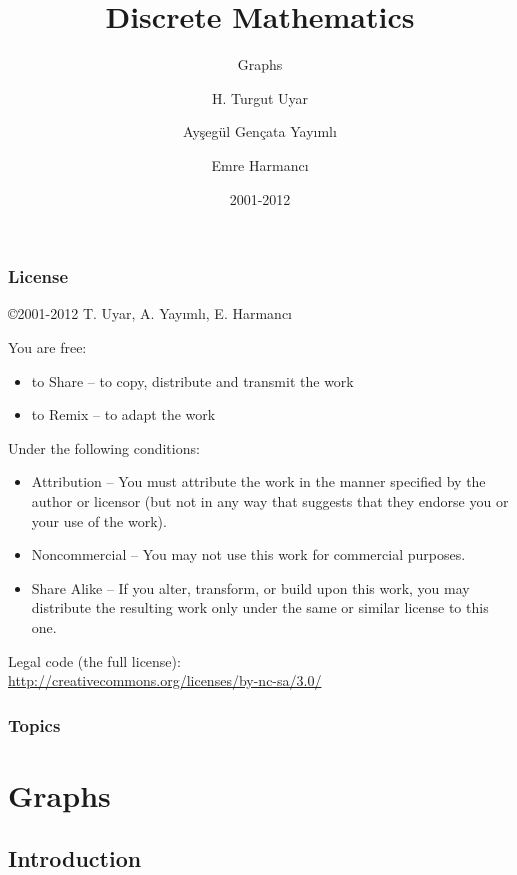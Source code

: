 \documentclass[dvipsnames]{beamer}
\title{Discrete Mathematics}
\subtitle{Graphs}
\author{H. Turgut Uyar \and Ayşegül Gençata Yayımlı \and Emre Harmancı}
\date{2001-2012}
\begin{document}
\begin{frame}
  \titlepage
\end{frame}

\begin{frame}
  \frametitle{License}

  \hfill
  \copyright 2001-2012 T. Uyar, A. Yayımlı, E. Harmancı

  \vfill
  \begin{tiny}
    You are free:
    \begin{itemize}
      \item to Share -- to copy, distribute and transmit the work
      \item to Remix -- to adapt the work
    \end{itemize}

    Under the following conditions:
    \begin{itemize}
      \item Attribution -- You must attribute the work in the manner specified by
        the author or licensor (but not in any way that suggests that they
        endorse you or your use of the work).

      \item Noncommercial -- You may not use this work for commercial purposes.

      \item Share Alike -- If you alter, transform, or build upon this work, you
        may distribute the resulting work only under the same or similar license
        to this one.
    \end{itemize}
  \end{tiny}

  \vfill
  Legal code (the full license):\\
  \url{http://creativecommons.org/licenses/by-nc-sa/3.0/}
\end{frame}

\begin{frame}
  \frametitle{Topics}
  \tableofcontents
\end{frame}

\section{Graphs}

\subsection{Introduction}
\end{document}
